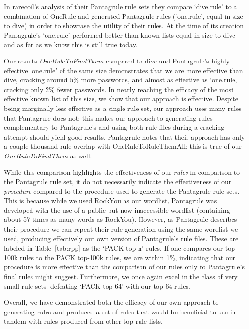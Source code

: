 \documentclass{article}
\begin{document}
In rarecoil's analysis of their Pantagrule rule sets
they compare `dive.rule' to a combination of OneRule and generated Pantagrule
rules (`one.rule', equal in size to dive) in order to showcase the utility of their
rules. At the time of its creation Pantagrule's `one.rule' performed better than
known lists equal in size to dive and as far as we know this is still true today.

Our results \textit{OneRuleToFindThem} compared to dive and Pantagrule's highly
effective `one.rule' of the same size demonstrates that we are
more effective than dive, cracking around 5\% more passwords, and almost as effective
as `one.rule,' cracking only 2\% fewer passwords. In nearly reaching the
efficacy of
the most effective known list of this size, we show that our approach is
effective. Despite being marginally less effective as a single rule set, our approach
uses many rules that Pantagrule does not; this makes our approach to generating
rules complementary to Pantagrule's and using both rule files during a cracking
attempt should yield good results. Pantagrule notes that their approach has only
a couple-thousand rule overlap with OneRuleToRuleThemAll; this is true
of our \textit{OneRuleToFindThem} as well.

While this comparison highlights the effectiveness of our \textit{rules} in
comparison to the Pantagrule rule set, it do not necessarily indicate the
effectiveness of our \textit{procedure} compared to the procedure used to
generate the Pantagrule rule sets. This is because while we used RockYou as our
wordlist, Pantagrule was developed with the use of a public but now
inaccessible wordlist (containing about 57 times as many words as RockYou).
However, as Pantagrule describes their procedure we can
repeat their rule generation using the same wordlist we used, producing
effectively our own version of Pantagrule's rule files. These are labeled in
Table~\ref{tab:rpp} as the `PACK top-n' rules. If one compares our top-100k
rules
to the PACK top-100k rules, we are within 1\%, indicating that our procedure
is more effective than the comparison of our rules only to Pantagrule's final
rules might suggest. Furthermore, we once again excel in the class of very
small rule sets, defeating `PACK top-64' with our top 64 rules.

Overall, we have demonstrated both the efficacy of our
own approach to generating rules and produced a set of rules that would be
beneficial to use in tandem with rules produced from other top rule lists.
\end{document}
